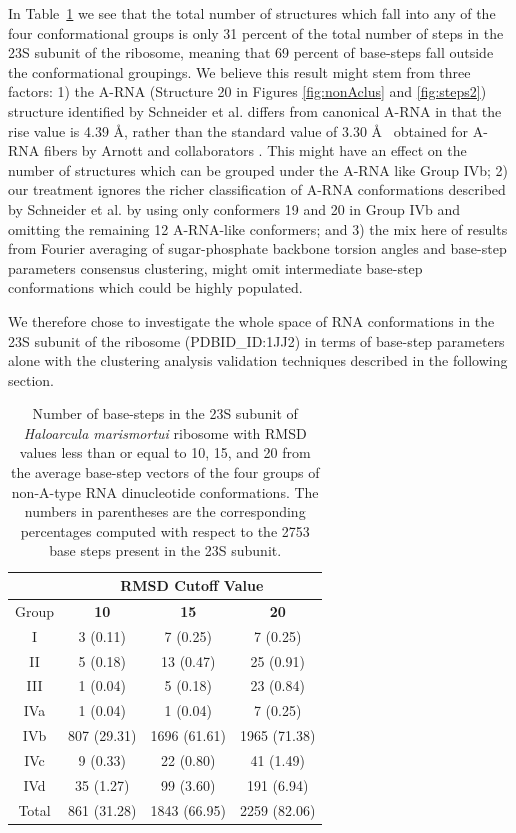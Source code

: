 In  Table~\ref{tab:nonA} we see  that the  total number  of structures
which  fall into  any of  the four  conformational groups  is  only 31
percent  of the  total  number of  steps  in the  23S  subunit of  the
ribosome,  meaning that  69  percent of  base-steps  fall outside  the
conformational groupings. We believe this result might stem from three
factors: 1) the A-RNA  (Structure 20 in Figures \ref{fig:nonAclus} and
\ref{fig:steps2})  structure identified by  Schneider et  al.  differs
from canonical A-RNA  in that the rise value is  4.39 \AA, rather than
the standard  value of 3.30 \AA~  obtained for A-RNA  fibers by Arnott
and collaborators \cite{arnott1973}.  This might have an effect on the
number of structures  which can be grouped under  the A-RNA like Group
IVb;  2) our  treatment  ignores the  richer  classification of  A-RNA
conformations described  by Schneider et  al.  \cite{schneider2004} by
using  only  conformers  19 and  20  in  Group  IVb and  omitting  the
remaining 12  A-RNA-like conformers;  and 3) the  mix here  of results
from Fourier averaging of  sugar-phosphate backbone torsion angles and
base-step  parameters consensus  clustering,  might omit  intermediate
base-step conformations which could be highly populated.

We therefore chose to investigate the whole space of RNA conformations
in  the 23S  subunit  of  the ribosome  (PDBID\_ID:1JJ2)  in terms  of
base-step  parameters alone  with the  clustering  analysis validation
techniques described in the following section.

\begin{table}[htbp]
\begin{center}
{\footnotesize
\begin{tabular}{c|c|c|c}
\hline
 & \multicolumn{3}{c}{\bf{RMSD Cutoff Value}}\\ \hline
Group   & \bf{10} & \bf{15} & \bf{20}\\ \hline
I & 3 (0.11) & 7 (0.25) & 7 (0.25)\\ \hline
II & 5 (0.18) & 13 (0.47) & 25 (0.91)\\ \hline
III & 1 (0.04) & 5 (0.18) & 23 (0.84)\\ \hline
IVa & 1 (0.04) & 1 (0.04) & 7 (0.25)\\ \hline
IVb & 807 (29.31) & 1696 (61.61) & 1965 (71.38)\\ \hline
IVc & 9 (0.33) & 22 (0.80) & 41 (1.49)\\ \hline
IVd & 35 (1.27) & 99 (3.60) & 191 (6.94)\\ \hline \hline
Total & 861 (31.28) & 1843 (66.95) & 2259 (82.06)\\ \hline
\end{tabular}
}
\caption{Number of base-steps in the 23S subunit of \textit{Haloarcula
marismortui} ribosome with  RMSD values less than or  equal to 10, 15,
and  20 from  the  average base-step  vectors  of the  four groups  of
non-A-type RNA dinucleotide  conformations. The numbers in parentheses
are the  corresponding percentages computed  with respect to  the 2753
base steps present in the 23S subunit.}
\label{tab:nonA}
\end{center}
\end{table}

